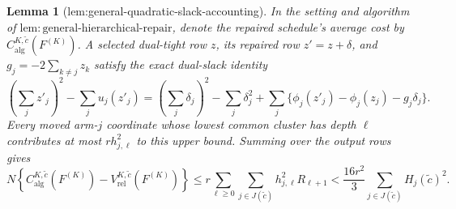 \documentclass{article}
\newtheorem{lemma}{Lemma}
\begin{document}
\begin{lemma}[lem:general-quadratic-slack-accounting]\label{lem:general-quadratic-slack-accounting}
In the setting and algorithm of \(\mathrm{lem{:}general\mbox{-}hierarchical\mbox{-}repair}\), denote the repaired schedule's average cost by \(C_{\mathrm{alg}}^{K,\widetilde c}(F^{(K)})\).  A selected dual-tight row \(z\), its repaired row \(z'=z+\delta\), and \(g_j=-2\sum_{k\ne j}z_k\) satisfy the exact dual-slack identity
\[
 \left(\sum_jz'_j\right)^2-\sum_ju_j(z'_j)
 =\left(\sum_j\delta_j\right)^2-\sum_j\delta_j^2
 +\sum_j\{\phi_j(z'_j)-\phi_j(z_j)-g_j\delta_j\}.
\]
Every moved arm-\(j\) coordinate whose lowest common cluster has depth \(\ell\) contributes at most \(r h_{j,\ell}^2\) to this upper bound.  Summing over the output rows gives
\[
 N\left\{C_{\mathrm{alg}}^{K,\widetilde c}(F^{(K)})-
 V_{\mathrm{rel}}^{K,\widetilde c}(F^{(K)})\right\}
 \le r\sum_{\ell\ge0}\sum_{j\in J(\widetilde c)}h_{j,\ell}^2R_{\ell+1}
 <\frac{16r^2}{3}\sum_{j\in J(\widetilde c)}H_j(\widetilde c)^2.
\]
\end{lemma}
\end{document}
